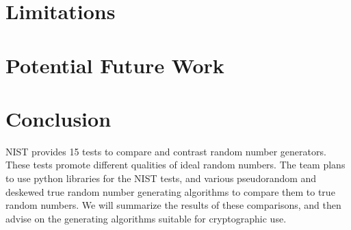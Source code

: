 \documentclass[11pt,letterpaper,conference]{IEEEtran}
\begin{document}
\section{Limitations}
\section{Potential Future Work}
\section{Conclusion}
NIST provides 15 tests to compare and contrast random number generators. These tests promote different qualities of ideal random numbers. The team plans to use python libraries for the NIST tests, and various pseudorandom and deskewed true random number generating algorithms to compare them to true random numbers. We will summarize the results of these comparisons, and then advise on the generating algorithms suitable for cryptographic use.




\printbibliography[heading=bibintoc, title={References}]
\end{document}
